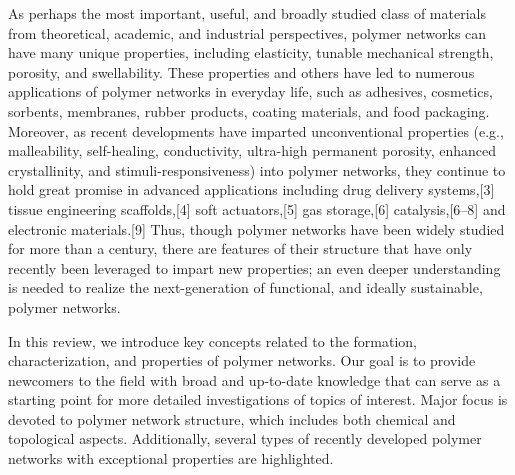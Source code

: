 \documentclass[../../main-notes.tex]{subfiles}
\begin{document}
As perhaps the most important, useful, and broadly studied class of materials from theoretical, academic, and industrial perspectives, polymer networks can have many unique properties, including elasticity, tunable mechanical strength, porosity, and swellability. 
These properties and others have led to numerous applications of polymer networks in everyday life, such as adhesives, cosmetics, sorbents, membranes, rubber products, coating materials, and food packaging. 
Moreover, as recent developments have imparted unconventional properties (e.g., malleability, self-healing, conductivity, ultra-high permanent porosity, enhanced crystallinity, and stimuli-responsiveness) into polymer networks, they continue to hold great promise in advanced applications including drug delivery systems,[3] tissue engineering scaffolds,[4] soft actuators,[5] gas storage,[6] catalysis,[6–8] and electronic materials.[9] 
Thus, though polymer networks have been widely studied for more than a century, there are features of their structure that have only recently been leveraged to impart new properties; an even deeper understanding is needed to realize the next-generation of functional, and ideally sustainable, polymer networks. 

In this review, we introduce key concepts related to the formation, characterization, and properties of polymer networks. 
Our goal is to provide newcomers to the field with broad and up-to-date knowledge that can serve as a starting point for more detailed investigations of topics of interest. 
Major focus is devoted to polymer network structure, which includes both chemical and topological aspects. 
Additionally, several types of recently developed polymer networks with exceptional properties are highlighted.
\end{document}
